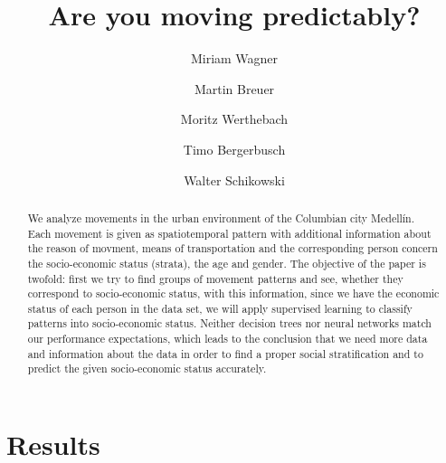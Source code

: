 \documentclass[runningheads]{llncs}
\begin{document}
	
	
	\title{Are you moving predictably?}
	\author{Miriam Wagner\and
		Martin Breuer\and
		Moritz Werthebach\and
		Timo Bergerbusch\and
		Walter Schikowski}
	\maketitle              %
	\begin{abstract}
		We analyze movements in the urban environment of the Columbian city Medellín. Each movement is given as spatiotemporal pattern with additional information about the reason of movment, means of transportation and the corresponding person concern the socio-economic status (strata), the age and gender. 
		The objective of the paper is twofold: first we try to find groups of movement patterns and see, whether they correspond to socio-economic status, with this information, since we have the economic status of each person in the data set, we will apply supervised learning to classify patterns into socio-economic status.
		Neither decision trees nor neural networks match our performance expectations, which leads to the conclusion that we need more data and information about the data in order to find a proper social stratification and to predict the given socio-economic status accurately.
		
	\end{abstract}
	
	
	

%	
	
	\section{Results}
		
\end{document}
